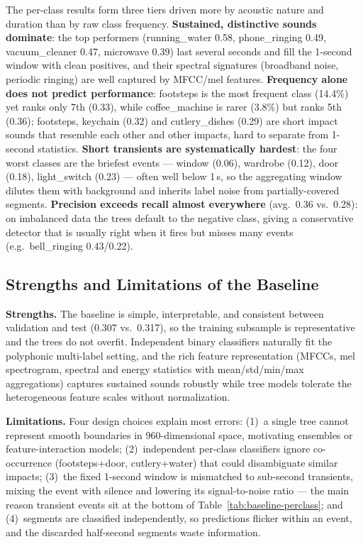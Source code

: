\documentclass{article}
\begin{document}
The per-class results form three tiers driven more by acoustic nature and duration than by raw class frequency. \textbf{Sustained, distinctive sounds dominate}: the top performers (running\_water 0.58, phone\_ringing 0.49, vacuum\_cleaner 0.47, microwave 0.39) last several seconds and fill the 1-second window with clean positives, and their spectral signatures (broadband noise, periodic ringing) are well captured by MFCC/mel features. \textbf{Frequency alone does not predict performance}: footsteps is the most frequent class (14.4\%) yet ranks only 7th (0.33), while coffee\_machine is rarer (3.8\%) but ranks 5th (0.36); footsteps, keychain (0.32) and cutlery\_dishes (0.29) are short impact sounds that resemble each other and other impacts, hard to separate from 1-second statistics. \textbf{Short transients are systematically hardest}: the four worst classes are the briefest events --- window (0.06), wardrobe (0.12), door (0.18), light\_switch (0.23) --- often well below 1\,s, so the aggregating window dilutes them with background and inherits label noise from partially-covered segments. \textbf{Precision exceeds recall almost everywhere} (avg.\ 0.36 vs.\ 0.28): on imbalanced data the trees default to the negative class, giving a conservative detector that is usually right when it fires but misses many events (e.g.\ bell\_ringing 0.43/0.22).

\subsection{Strengths and Limitations of the Baseline}

\textbf{Strengths.} The baseline is simple, interpretable, and consistent between validation and test (0.307 vs.\ 0.317), so the training subsample is representative and the trees do not overfit. Independent binary classifiers naturally fit the polyphonic multi-label setting, and the rich feature representation (MFCCs, mel spectrogram, spectral and energy statistics with mean/std/min/max aggregations) captures sustained sounds robustly while tree models tolerate the heterogeneous feature scales without normalization.

\textbf{Limitations.} Four design choices explain most errors: (1)~a single tree cannot represent smooth boundaries in 960-dimensional space, motivating ensembles or feature-interaction models; (2)~independent per-class classifiers ignore co-occurrence (footsteps+door, cutlery+water) that could disambiguate similar impacts; (3)~the fixed 1-second window is mismatched to sub-second transients, mixing the event with silence and lowering its signal-to-noise ratio --- the main reason transient events sit at the bottom of Table~\ref{tab:baseline-perclass}; and (4)~segments are classified independently, so predictions flicker within an event, and the discarded half-second segments waste information.
\end{document}
